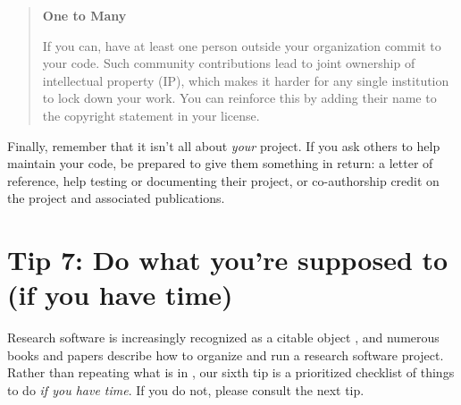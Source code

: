 \documentclass[10pt,letterpaper]{article}
\begin{document}
\begin{quote}
  \noindent
  \textbf{One to Many}

  If you can, have at least one person outside your organization commit to your code.
  Such community contributions lead to joint ownership of intellectual property (IP),
  which makes it harder for any single institution to lock down your work.
  You can reinforce this by adding their name to the copyright statement in your license.
\end{quote}

Finally,
remember that it isn't all about \emph{your} project.
If you ask others to help maintain your code,
be prepared to give them something in return:
a letter of reference,
help testing or documenting their project,
or co-authorship credit on the project and associated publications.

\section*{Tip 7: Do what you're supposed to (if you have time)}

Research software is increasingly recognized as a citable object \cite{Smith2016,Katz2021,Garijo2024},
and numerous books and papers describe how to organize and run a research software project.
Rather than repeating what is in
\cite{Sandve2013,Wilson2014,Lee2018a,Dryden2019,Akhmerov2020,Chue2021,Lees2022,Druskat2023,Akhmerov2023,Kumar2023,Struck2023,Reina2024},
our sixth tip is a prioritized checklist of things to do
\emph{if you have time}.
If you do not,
please consult the next tip.
\end{document}
